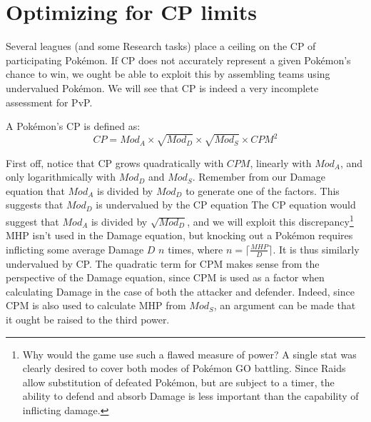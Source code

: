 \chapter{Optimizing for CP limits}

Several leagues (and some Research tasks) place a ceiling on the CP of
 participating Pokémon.
If CP does not accurately represent a given Pokémon's chance to win, we ought
 be able to exploit this by assembling teams using undervalued Pokémon.
We will see that CP is indeed a very incomplete assessment for PvP.

A Pokémon's CP is defined as:
\[ CP = Mod_A \times \sqrt{Mod_D} \times \sqrt{Mod_S} \times CPM^2 \]

First off, notice that CP grows quadratically with $CPM$,
 linearly with $Mod_A$, and only logarithmically with
 $Mod_D$ and $Mod_S$.
Remember from our Damage equation that $Mod_A$ is divided by $Mod_D$
 to generate one of the factors.
This suggests that $Mod_D$ is undervalued by the CP equation
The CP equation would suggest that $Mod_A$ is divided by $\sqrt{Mod_D}$,
 and we will exploit this discrepancy\footnote{Why would the game use such
 a flawed measure of power? A single stat was clearly desired to cover both
 modes of Pokémon GO battling. Since Raids allow substitution of defeated
 Pokémon, but are subject to a timer, the ability to defend and absorb
 Damage is less important than the capability of inflicting damage.}
MHP isn't used in the Damage equation, but knocking out a Pokémon
 requires inflicting some average Damage $D$ $n$ times,
 where $n = \lceil\frac{MHP}{D}\rceil$.
It is thus similarly undervalued by CP\@.
The quadratic term for CPM makes sense from the perspective of the Damage
 equation, since CPM is used as a factor when calculating Damage in the
 case of both the attacker and defender.
Indeed, since CPM is also used to calculate MHP from $Mod_S$, an argument
 can be made that it ought be raised to the third power.
